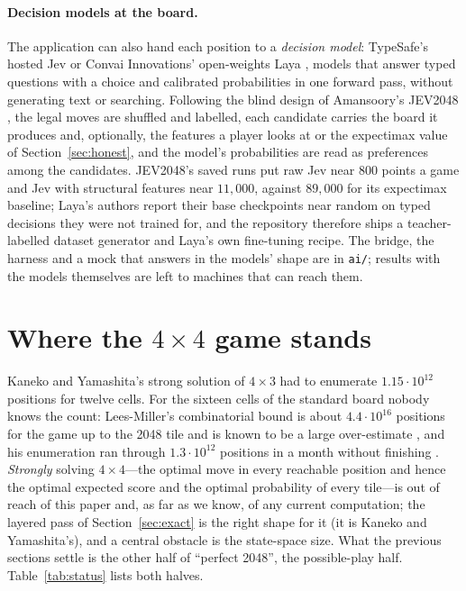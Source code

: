 \documentclass[11pt]{article}
\theoremstyle{definition}
\theoremstyle{remark}
\begin{document}
\paragraph{Decision models at the board.} The application can also hand
each position to a \emph{decision model}: TypeSafe's hosted Jev
\cite{typesafejev} or Convai Innovations' open-weights Laya
\cite{laya2026}, models that answer typed questions with a choice and
calibrated probabilities in one forward pass, without generating text or
searching. Following the blind design of Amansoory's JEV2048
\cite{jev2048}, the legal moves are shuffled and labelled, each candidate
carries the board it produces and, optionally, the features a player
looks at or the expectimax value of Section~\ref{sec:honest}, and the
model's probabilities are read as preferences among the candidates.
JEV2048's saved runs put raw Jev near $800$ points a game and Jev with
structural features near $11{,}000$, against $89{,}000$ for its
expectimax baseline; Laya's authors report their base checkpoints near
random on typed decisions they were not trained for, and the repository
therefore ships a teacher-labelled dataset generator and Laya's own
fine-tuning recipe. The bridge, the harness and a mock that answers in
the models' shape are in \texttt{ai/}; results with the models
themselves are left to machines that can reach them.

\section{Where the \texorpdfstring{$4\times4$}{4x4} game stands}\label{sec:recent}

Kaneko and Yamashita's strong solution of $4\times3$ \cite{kaneko2026}
had to enumerate $1.15\cdot10^{12}$ positions for twelve cells. For the
sixteen cells of the standard board nobody knows the count: Lees-Miller's
combinatorial bound is about $4.4\cdot10^{16}$ positions for the game up
to the 2048 tile and is known to be a large over-estimate
\cite{leesmiller2017c}, and his enumeration ran through
$1.3\cdot10^{12}$ positions in a month without finishing
\cite{leesmiller2017b}. \emph{Strongly} solving $4\times4$---the
optimal move in every reachable position and hence the optimal expected
score and the optimal probability of every tile---is out of reach of this
paper and, as far as we know, of any current computation; the layered
pass of Section~\ref{sec:exact} is the right shape for it (it is
Kaneko and Yamashita's), and a central obstacle is the state-space size. What the
previous sections settle is the other half of ``perfect 2048'', the
possible-play half. Table~\ref{tab:status} lists both halves.
\end{document}

